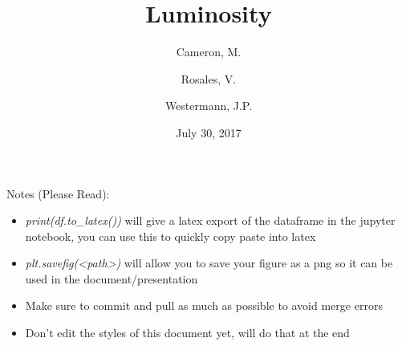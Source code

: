 \documentclass[12pt,fleqn,leqno,letterpaper]{article}
\title{Luminosity}
\author{
  Cameron, M.
  \and
  Rosales, V.
  \and
  Westermann, J.P.
}
\date{July 30, 2017}
\begin{document}
\maketitle

\newpage
\tableofcontents
\listoffigures
\listoftables

\newpage

Notes (Please Read):
\begin{itemize}
  \item \textit{print(df.to\_latex())} will give a latex export of the dataframe in the jupyter notebook, you can use this to quickly copy paste into latex
  \item \textit{plt.savefig(<path>)} will allow you to save your figure as a png so it can be used in the document/presentation
  \item Make sure to commit and pull as much as possible to avoid merge errors
  \item Don't edit the styles of this document yet, will do that at the end
\end{itemize}
\end{document}

